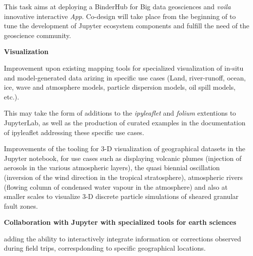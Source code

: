 \begin{task}[
  title=Demonstrator: Geosciences,
  id=geoscience,
  lead=UIO,
  PM=25,
  wphases={0-48},
  partners={EGI,QS,SRL,UPSUD}
]


This task aims at deploying a BinderHub for Big data geosciences and \emph{voila} innovative interactive \emph{App}. Co-design will take place from the beginning of \TheProject to tune the development of Jupyter ecosystem components and fulfill the need of the geoscience community.

\textbf{Visualization}

\begin{compactitem}
  \item Improvement upon existing mapping tools for specialized
    visualization of in-situ and model-generated data arizing in
    specific use cases (Land, river-runoff, ocean, ice, wave and
    atmosphere models, particle dispersion models, oil spill models,
    etc.).

    This may take the form of additions to the \emph{ipyleaflet} and
    \emph{folium} extentions to JupyterLab, as well as the production of
    curated examples in the documentation of ipyleaflet addressing these
    specific use cases.

  \item Improvements of the tooling for 3-D visualization of
    geographical datasets in the Jupyter notebook, for use cases such as
    displaying volcanic plumes (injection of aerosols in the various
    atmospheric layers), the quasi biennial oscillation (inversion of
    the wind direction in the tropical stratosphere), atmospheric rivers
    (flowing column of condensed water vapour in the atmosphere) and
    also at smaller scales to visualize 3-D discrete particle simulations
    of sheared granular fault zones.
\end{compactitem}

\textbf{Collaboration with Jupyter with specialized tools for earth sciences}

\begin{compactitem}
  \item adding the ability to interactively integrate information or corrections
    observed during field trips, correspdonding to specific geographical locations.



\end{compactitem}
\end{task}
